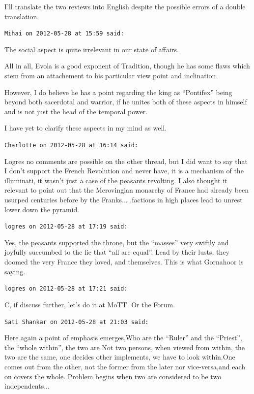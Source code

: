 \begin{footnotesize}
\begin{sffamily}
I'll translate the two reviews into English despite the possible errors of a double translation.

\hfill

\texttt{Mihai on 2012-05-28 at 15:59 said:}

The social aspect is quite irrelevant in our state of affairs.

All in all, Evola is a good exponent of Tradition, though he has some flaws which stem from an attachement to his particular view point and inclination.

However, I do believe he has a point regarding the king as ``Pontifex'' being beyond both sacerdotal and warrior, if he unites both of these aspects in himself and is not just the head of the temporal power.

I have yet to clarify these aspects in my mind as well.

\hfill

\texttt{Charlotte on 2012-05-28 at 16:14 said:}

Logres no comments are possible on the other thread, but I did want to say that I don't support the French Revolution and never have, it is a mechanism of the illuminati, it wasn't just a case of the peasants revolting. I also thought it relevant to point out that the Merovingian monarchy of France had already been usurped centuries before by the Franks... .factions in high places lead to unrest lower down the pyramid.

\hfill

\texttt{logres on 2012-05-28 at 17:19 said:}

Yes, the peasants supported the throne, but the ``masses'' very swiftly and joyfully succumbed to the lie that ``all are equal''. Lead by their lusts, they doomed the very France they loved, and themselves. This is what Gornahoor is saying.

\hfill

\texttt{logres on 2012-05-28 at 17:21 said:}

C, if discuss further, let's do it at MoTT. Or the Forum.

\hfill

\texttt{Sati Shankar on 2012-05-28 at 21:03 said:}

Here again a point of emphasis emerges,Who are the ``Ruler'' and the ``Priest'', the ``whole within'', the two are Not two persons, when viewed from within, the two are the same, one decides other implements, we have to look within.One comes out from the other, not the former from the later nor vice-versa,and each on covers the whole. Problem begins when two are considered to be two independents... 


\end{sffamily}
\end{footnotesize}
